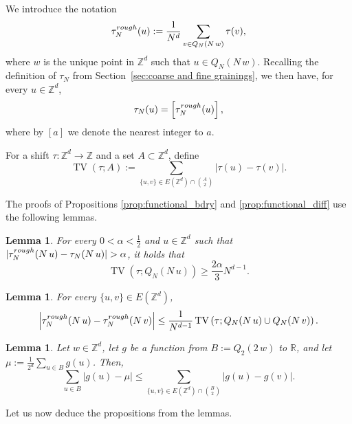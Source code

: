 \documentclass[11pt, reqno]{amsart}
\newtheorem{lemma}[theorem]{Lemma}
\newcommand{\Z}{\mathbb{Z}}
\newcommand{\R}{\mathbb{R}}
\DeclareMathOperator{\TV}{TV}
\numberwithin{equation}{section}
\begin{document}
We introduce the notation
$$\tau^{\rm rough}_N (u):=
\frac{1}{N^d}\sum_{v\in Q_N(N\,w)}
\tau(v),
$$
where $w$ is the unique point in ${\mathbb Z}^d$ such that $u\in Q_N(N\,w)$. Recalling the definition of $\tau_N$ from Section~\ref{sec:coarse and fine grainings}, we then have, for every $u\in{\mathbb Z}^d$,
$$
\tau_N (u)= 
\left[ \tau^{\rm rough}_N (u)\right],
$$
where by $\left[ a \right]$ we denote the nearest integer to $a$.

For a shift $\tau\colon \Z^d\to\Z$ and a set $A\subset\Z^d$, define
$$
\TV(\tau;A):= 
\sum_{\{u,v\}\in E(\Z^d)\cap\binom{A}{2}} \lvert \tau(u)-\tau(v) \rvert.
$$

The proofs of Propositions \ref{prop:functional_bdry} and \ref{prop:functional_diff} use the following lemmas.

\begin{lemma}\label{lem:Ron}
For every $0<\alpha<\frac{1}{2}$ and $u\in\Z^d$ such that $\lvert\tau^{\rm rough}_N(N\,u)-\tau_N(N\,u)\rvert>\alpha$, it holds that 
\begin{equation*}
\TV\left(\tau; Q_N(N\,u)\right)\geq \frac{2\alpha}{3} N^{d-1}.
\end{equation*}
\end{lemma}

\begin{lemma}
\label{lem:rough}
For every $\{u,v\}\in E(\Z^d)$, 
\begin{equation*}
\left\lvert\tau^{\rm rough}_N(N\,u)-\tau^{\rm rough}_N(N\,v)\right\rvert
\leq\frac{1}{N^{d-1}}\TV\left(\tau; Q_N(N\,u)\cup Q_N(N\,v)\right).
\end{equation*}
\end{lemma}

\begin{lemma}
\label{lem:diff_rough}
Let $w\in{\mathbb Z}^d$, let $g$ be a function from $B:=Q_2(2\,w)$ to $\R$, and let $\mu:=\frac{1}{2^d}\sum_{u\in B}g(u)$. Then,
$$
\sum_{u\in B} \lvert g(u)-\mu \rvert
\leq\sum_{\{u,v\}\in E(\Z^d)\cap\binom{B}{2}} \lvert g(u)-g(v) \rvert.
$$
\end{lemma}

Let us now deduce the propositions from the lemmas.
\end{document}
